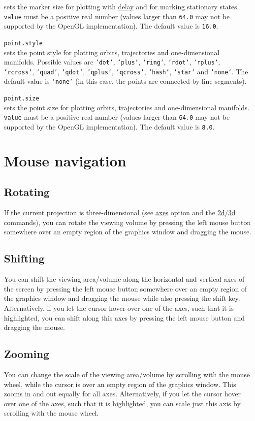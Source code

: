 \documentclass[10pt,a4paper,titlepage]{article}
\newcommand{\opt}[2]{\item{\T{\hypertarget{#1}{#1}\index[index]{#1} #2}}}
\newcommand{\HL}[1]{\hyperlink{#1}{#1}}
\newcommand{\T}[1]{\texttt{#1}}
\begin{document}
\begin{description}
sets the marker size for plotting with \HL{delay} and for marking stationary states. \T{value} must be a positive real number (values larger than \T{64.0} may not be supported by the OpenGL implementation). The default value is \T{16.0}.
\opt{point.style}{}\\
sets the point style for plotting orbits, trajectories and one-dimensional manifolds. Possible values are \T{'dot'}, \T{'plus'}, \T{'ring'}, \T{'rdot'}, \T{'rplus'}, \T{'rcross'}, \T{'quad'}, \T{'qdot'}, \T{'qplus'}, \T{'qcross'}, \T{'hash'}, \T{'star'} and \T{'none'}. The default value is \T{'none'} (in this case, the points are connected by line segments).
\opt{point.size}{}\\ 
sets the point size for plotting orbits, trajectories and one-dimensional manifolds.  \T{value} must be a positive real number (values larger than \T{64.0} may not be supported by the OpenGL implementation). The default value is \T{8.0}.
\end{description}
 \newpage\section{Mouse navigation}
\label{sec::mouse}
\subsection{Rotating}
If the current projection is three-dimensional (see \HL{axes} option and the \HL{2d}/\HL{3d} commands), you can rotate the viewing volume by pressing the left mouse button somewhere over an empty region of the graphics window and dragging the mouse.
\subsection{Shifting}
You can shift the viewing area/volume along the horizontal and vertical axes of the screen by pressing the left mouse button somewhere over an empty region of the graphics window and dragging the mouse while also pressing the shift key. Alternatively, if you let the cursor hover over one of the axes, such that it is highlighted, you can shift along this axes by pressing the left mouse button and dragging the mouse.
\subsection{Zooming}
You can change the scale of the viewing area/volume by scrolling with the mouse wheel, while the cursor is over an empty region of the graphics window. This zooms in and out equally for all axes. Alternatively, if you let the cursor hover over one of the axes, such that it is highlighted, you can scale just this axis by scrolling with the mouse wheel.
\end{document}
